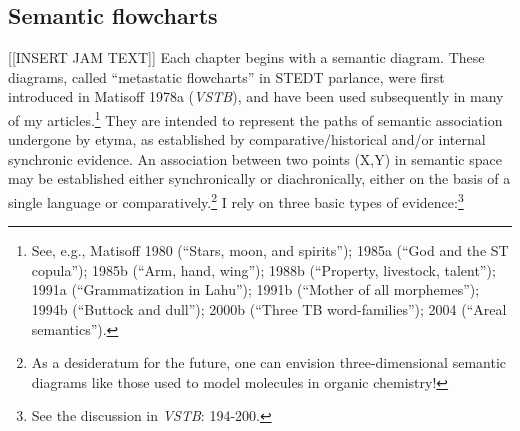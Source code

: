\subsection{Semantic flowcharts}
[[INSERT JAM TEXT]]
Each chapter begins with a semantic diagram.  These diagrams, called
“metastatic flowcharts” in STEDT parlance, were first introduced in Matisoff 1978a (\textit{VSTB}),
and have been used subsequently in many of my articles.\footnote{See, e.g.,
Matisoff 1980 (“Stars, moon, and spirits”); 1985a (“God and the ST copula”);
1985b (“Arm, hand, wing”); 1988b (“Property, livestock, talent”); 1991a
(“Grammatization in Lahu”); 1991b (“Mother of all morphemes”); 1994b (“Buttock
and dull”); 2000b (“Three TB word-families”); 2004 (“Areal semantics”).}
They
are intended to represent the paths of semantic association undergone by etyma,
as established by comparative/historical and/or internal synchronic evidence. An
association between two points (X,Y) in semantic space may be established either
synchronically or diachronically, either on the basis of a single language or
comparatively.\footnote{As a desideratum for the future, one can envision
three-dimensional semantic diagrams like those used to model molecules in
organic chemistry!}  I rely on three basic types of evidence:\footnote{See the
discussion in \textit{VSTB}: 194-200.}

